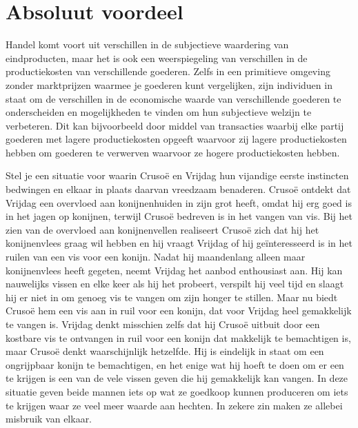 \documentclass[
  a5paper,
  smalldemyvopaper,11pt,twoside,onecolumn,openright,extrafontsizes,
hidelinks]{memoir}
\begin{document}
\section{Absoluut voordeel}\label{absoluut-voordeel}

Handel komt voort uit verschillen in de subjectieve waardering van
eindproducten, maar het is ook een weerspiegeling van verschillen in de
productiekosten van verschillende goederen. Zelfs in een primitieve
omgeving zonder marktprijzen waarmee je goederen kunt vergelijken, zijn
individuen in staat om de verschillen in de economische waarde van
verschillende goederen te onderscheiden en mogelijkheden te vinden om
hun subjectieve welzijn te verbeteren. Dit kan bijvoorbeeld door middel
van transacties waarbij elke partij goederen met lagere productiekosten
opgeeft waarvoor zij lagere productiekosten hebben om goederen te
verwerven waarvoor ze hogere productiekosten hebben.

Stel je een situatie voor waarin Crusoë en Vrijdag hun vijandige eerste
instincten bedwingen en elkaar in plaats daarvan vreedzaam benaderen.
Crusoë ontdekt dat Vrijdag een overvloed aan konijnenhuiden in zijn grot
heeft, omdat hij erg goed is in het jagen op konijnen, terwijl Crusoë
bedreven is in het vangen van vis. Bij het zien van de overvloed aan
konijnenvellen realiseert Crusoë zich dat hij het konijnenvlees graag
wil hebben en hij vraagt Vrijdag of hij geïnteresseerd is in het ruilen
van een vis voor een konijn. Nadat hij maandenlang alleen maar
konijnenvlees heeft gegeten, neemt Vrijdag het aanbod enthousiast aan.
Hij kan nauwelijks vissen en elke keer als hij het probeert, verspilt
hij veel tijd en slaagt hij er niet in om genoeg vis te vangen om zijn
honger te stillen. Maar nu biedt Crusoë hem een vis aan in ruil voor een
konijn, dat voor Vrijdag heel gemakkelijk te vangen is. Vrijdag denkt
misschien zelfs dat hij Crusoë uitbuit door een kostbare vis te
ontvangen in ruil voor een konijn dat makkelijk te bemachtigen is, maar
Crusoë denkt waarschijnlijk hetzelfde. Hij is eindelijk in staat om een
ongrijpbaar konijn te bemachtigen, en het enige wat hij hoeft te doen om
er een te krijgen is een van de vele vissen geven die hij gemakkelijk
kan vangen. In deze situatie geven beide mannen iets op wat ze goedkoop
kunnen produceren om iets te krijgen waar ze veel meer waarde aan
hechten. In zekere zin maken ze allebei misbruik van elkaar.
\end{document}
